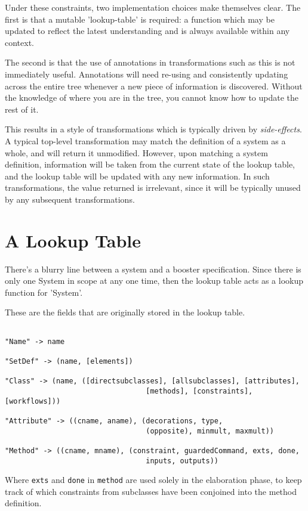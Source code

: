Under these constraints, two implementation choices make themselves
clear.  The first is that a mutable 'lookup-table' is required: a
function which may be updated to reflect the latest understanding and
is always available within any context.

The second is that the use of annotations in transformations such as
this is not immediately useful.  Annotations will need re-using and
consistently updating across the entire tree whenever a new piece of
information is discovered.  Without the knowledge of where you are in
the tree, you cannot know how to update the rest of it.  

This results in a style of transformations which is typically driven
by \emph{side-effects}.  A typical top-level transformation may match
the definition of a system as a whole, and will return it unmodified.
However, upon matching a system definition, information will be taken
from the current state of the lookup table, and the lookup table will
be updated with any new information.  In such transformations, the
value returned is irrelevant, since it will be typically unused by any
subsequent transformations.




\section{A Lookup Table}

There's a blurry line between a system and a booster specification.
Since there is only one System in scope at any one time, then the
lookup table acts as a lookup function for 'System'.

These are the fields that are originally stored in the lookup table.

\begin{verbatim}

"Name" -> name

"SetDef" -> (name, [elements])

"Class" -> (name, ([directsubclasses], [allsubclasses], [attributes],  
                                 [methods], [constraints], [workflows]))

"Attribute" -> ((cname, aname), (decorations, type, 
                                 (opposite), minmult, maxmult)) 

"Method" -> ((cname, mname), (constraint, guardedCommand, exts, done, 
                                 inputs, outputs))

\end{verbatim}

Where \verb|exts| and \verb|done| in \verb|method| are used solely in the elaboration
phase, to keep track of which constraints from subclasses have been
conjoined into the method definition.
